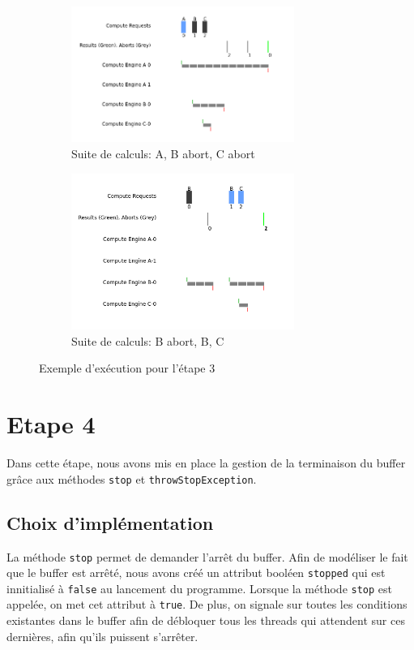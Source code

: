 \documentclass{article}
\begin{document}
\begin{figure}[h]
    \begin{subfigure}{0.45\textwidth}
        \centering
        \includegraphics[width=0.8\textwidth]{figures/A_B_Abort_C_Abort}
        \caption{Suite de calculs: A, B abort, C abort}
    \end{subfigure}
    \begin{subfigure}{0.45\textwidth}
        \centering
        \includegraphics[width=0.8\textwidth]{figures/B_Abort_B_C}
        \caption{Suite de calculs: B abort, B, C}
    \end{subfigure}
    \caption{Exemple d'exécution pour l'étape 3}
    \label{fig:full3}
\end{figure}

\section{Etape 4}
Dans cette étape, nous avons mis en place la gestion de la terminaison du buffer grâce aux méthodes \texttt{stop}
et \texttt{throwStopException}.

\subsection{Choix d'implémentation}
La méthode \texttt{stop} permet de demander l'arrêt du buffer.  Afin de modéliser
le fait que le buffer est arrêté, nous avons créé un attribut booléen \texttt{stopped} qui est innitialisé à \texttt{false}
au lancement du programme. Lorsque la méthode \texttt{stop} est appelée, on met cet attribut à \texttt{true}. De plus,
on signale sur toutes les conditions existantes dans le buffer afin de débloquer tous les threads qui attendent sur
ces dernières, afin qu'ils puissent s'arrêter.
\end{document}
